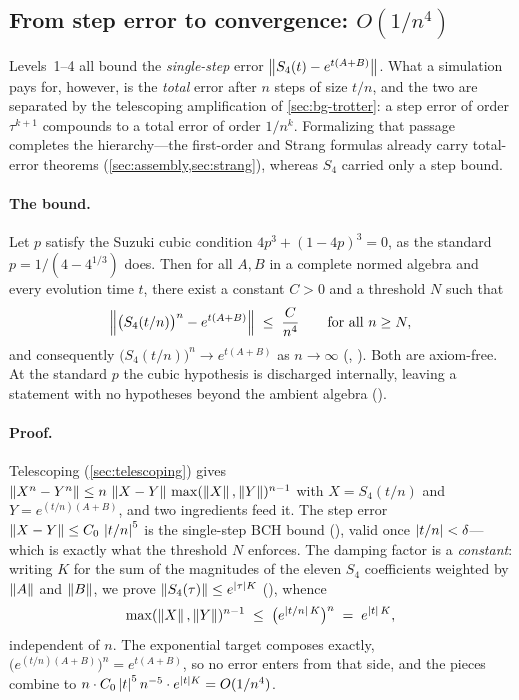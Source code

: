 \subsection{From step error to convergence:
  \texorpdfstring{$O(1/n^4)$}{O(1/n4)}}
\label{sec:s4-convergence}

Levels~1--4 all bound the \emph{single-step} error
$\left\|S_4(t) - e^{t(A+B)}\right\|$. What a simulation pays for, however, is the
\emph{total} error after $n$ steps of size $t/n$, and the two are separated by
the telescoping amplification of \cref{sec:bg-trotter}: a step error of order
$\tau^{k+1}$ compounds to a total error of order $1/n^{k}$. Formalizing that
passage completes the hierarchy---the first-order and Strang formulas already
carry total-error theorems (\cref{sec:assembly,sec:strang}), whereas $S_4$
carried only a step bound.

\paragraph{The bound.}
Let $p$ satisfy the Suzuki cubic condition $4p^3 + (1-4p)^3 = 0$, as the
standard $p = 1/(4 - 4^{1/3})$ does. Then for all $A, B$ in a complete normed
algebra and every evolution time $t$, there exist a constant $C > 0$ and a
threshold $N$ such that
\begin{equation}\label{eq:s4-quartic}
  \left\|\bigl(S_4(t/n)\bigr)^n - e^{t(A+B)}\right\| \;\le\; \frac{C}{n^4}
  \qquad \text{for all } n \ge N,
\end{equation}
and consequently $\bigl(S_4(t/n)\bigr)^n \to e^{t(A+B)}$ as $n \to \infty$
(,
).
Both are axiom-free. At the standard $p$ the cubic hypothesis is discharged
internally, leaving a statement with no hypotheses beyond the ambient algebra
().

\paragraph{Proof.}
Telescoping (\cref{sec:telescoping}) gives
$\left\|X^n - Y^n\right\| \le n\,\left\|X-Y\right\|\,\max(\left\|X\right\|,\left\|Y\right\|)^{n-1}$
with $X = S_4(t/n)$ and $Y = e^{(t/n)(A+B)}$, and two ingredients feed it.
The step error $\left\|X-Y\right\| \le C_0\,\left|t/n\right|^5$ is the single-step BCH bound
(),
valid once $\left|t/n\right| < \delta$---which is exactly what the threshold $N$
enforces. The damping factor is a \emph{constant}: writing $K$ for the sum of
the magnitudes of the eleven $S_4$ coefficients weighted by $\left\|A\right\|$ and
$\left\|B\right\|$, we prove $\left\|S_4(\tau)\right\| \le e^{\left|\tau\right| K}$
(), whence
\[
  \max(\left\|X\right\|,\left\|Y\right\|)^{n-1} \;\le\; \bigl(e^{\left|t/n\right|\,K}\bigr)^{n}
  \;=\; e^{\left|t\right|\,K},
\]
independent of $n$. The exponential target composes exactly,
$\bigl(e^{(t/n)(A+B)}\bigr)^n = e^{t(A+B)}$, so no error enters from that side,
and the pieces combine to
$n \cdot C_0 \left|t\right|^5 n^{-5} \cdot e^{\left|t\right| K} = O(1/n^4)$.

